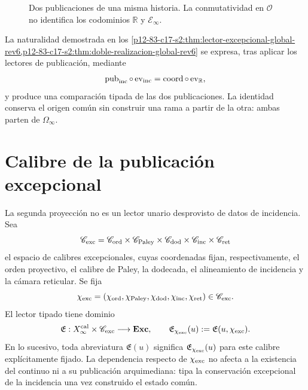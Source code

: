 \begin{figure}[H]
\centering
{}
\caption{Dos publicaciones de una misma historia. La conmutatividad en
\(\mathcal O\) no identifica los codominios \(\mathbb R\) y
\(\mathcal E_\infty\).}
\label{p12-83-c17-s5:fig:doble-publicacion-continuo-u024}
\end{figure}

La naturalidad demostrada en los
\cref{p12-83-c17-s2:thm:lector-excepcional-global-rev6,p12-83-c17-s2:thm:doble-realizacion-global-rev6}
se expresa, tras aplicar los lectores de publicación, mediante
\begin{equation}
 \operatorname{pub}_{\rm inc}\circ\operatorname{ev}_{\rm inc}
 =\operatorname{coord}\circ\operatorname{ev}_{\mathbb R},
 \label{p12-83-c17-s5:eq:compatibilidad-doble-publicacion-u024}
\end{equation}
y produce una comparación tipada de las dos publicaciones. La identidad
conserva el origen común sin construir una rama a partir de la otra: ambas
parten de \(\Omega_\infty\).


\section{Calibre de la publicación excepcional}

La segunda proyección no es un lector unario desprovisto de datos de
incidencia. Sea
\[
 \mathscr C_{\rm exc}
 =\mathscr C_{\rm ord}\times\mathscr C_{\rm Paley}
  \times\mathscr C_{\rm dod}\times\mathscr C_{\rm inc}
  \times\mathscr C_{\rm ret}
\]
el espacio de calibres excepcionales, cuyas coordenadas fijan,
respectivamente, el orden proyectivo, el calibre de Paley, la dodecada, el
alineamiento de incidencia y la cámara reticular. Se fija
\[
 \chi_{\rm exc}
 =(\chi_{\rm ord},\chi_{\rm Paley},\chi_{\rm dod},
   \chi_{\rm inc},\chi_{\rm ret})\in\mathscr C_{\rm exc}.
\]
El lector tipado tiene dominio
\[
 \mathfrak E:
 X_\infty^{\rm cal}\times\mathscr C_{\rm exc}
 \longrightarrow\mathbf{Exc},
 \qquad
 \mathfrak E_{\chi_{\rm exc}}(u):=\mathfrak E(u,\chi_{\rm exc}).
\]
En lo sucesivo, toda abreviatura \(\mathfrak E(u)\) significa
\(\mathfrak E_{\chi_{\rm exc}}(u)\) para este calibre explícitamente fijado.
La dependencia respecto de \(\chi_{\rm exc}\) no afecta a la existencia del
continuo ni a su publicación arquimediana: tipa la conservación excepcional
de la incidencia una vez construido el estado común.

